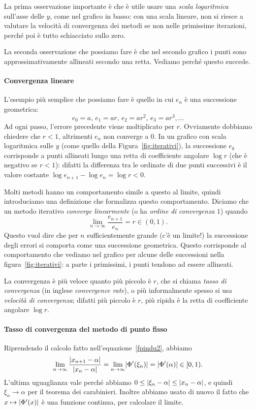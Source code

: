 \documentclass[a4paper]{report}
\DeclarePairedDelimiter{\abs}{\lvert}{\rvert}
\theoremstyle{definiton}
\theoremstyle{remark}
\begin{document}
La prima osservazione importante è che è utile usare una \emph{scala logaritmica} sull'asse delle $y$, come nel grafico in basso: con una scala lineare, non si riesce a valutare la velocità di convergenza dei metodi se non nelle primissime iterazioni, perché poi è tutto schiacciato sullo zero.

La seconda osservazione che possiamo fare è che nel secondo grafico i punti sono approssimativamente allineati secondo una retta. Vediamo perché questo succede.

\paragraph{Convergenza lineare} L'esempio più semplice che possiamo fare è quello in cui $e_n$ è una successione geometrica:
\[
e_0 = a,\, e_1 = ar,\, e_2 = ar^2,\, e_3 = ar^3, \dots
\]
Ad ogni passo, l'errore precedente viene moltiplicato per $r$. Ovviamente dobbiamo chiedere che $r < 1$, altrimenti $e_n$ non converge a $0$. In un grafico con scala logaritmica sulle $y$ (come quello della Figura~\ref{fig:iterativi}), la successione $e_k$ corrisponde a punti allineati lungo una retta di coefficiente angolare $\log r$ (che è negativo se $r<1$): difatti la differenza tra le ordinate di due punti successivi è il valore costante $\log e_{n+1} - \log e_n = \log r < 0$.

Molti metodi hanno un comportamento simile a questo al limite, quindi introduciamo una definizione che formalizza questo comportamento. Diciamo che un metodo iterativo \emph{converge linearmente} (o ha \emph{ordine di convergenza $1$}) quando
\begin{equation} \label{tassoconv}
    \lim_{n \to \infty }\frac{e_{n+1}}{e_n} = r \in (0,1).    
\end{equation}
Questo vuol dire che per $n$ sufficientemente grande (c'è un limite!) la successione degli errori si comporta come una successione geometrica. Questo corrisponde al comportamento che vediamo nel grafico per alcune delle successioni nella figura~\ref{fig:iterativi}: a parte i primissimi, i punti tendono ad essere allineati.

La convergenza è più veloce quanto più piccolo è $r$, che si chiama \emph{tasso di convergenza} (in inglese \emph{convergence rate}), o più informalmente spesso si usa \emph{velocità di convergenza}; difatti più piccolo è $r$, più ripida è la retta di coefficiente angolare $\log r$.

\paragraph{Tasso di convergenza del metodo di punto fisso} Riprendendo il calcolo fatto nell'equazione~\eqref{fpindu2}, abbiamo
\[
\lim_{n \to \infty} \frac{\abs{x_{n+1} - \alpha}}{\abs{x_n - \alpha}} = \lim_{n\to\infty} \abs{\Phi'(\xi_n)} = \abs{\Phi'(\alpha)} \in [0,1).
\]
L'ultima uguaglianza vale perché abbiamo $0 \leq \abs{\xi_n - \alpha} \leq \abs{x_n - \alpha}$, e quindi $\xi_n \to \alpha$ per il teorema dei carabinieri. Inoltre abbiamo usato di nuovo il fatto che $x \mapsto \abs{\Phi'(x)}$ è una funzione continua, per calcolare il limite.
\end{document}
